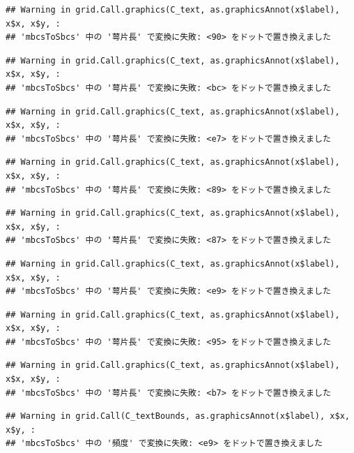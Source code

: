 \documentclass[
]{book}
\begin{document}
\begin{verbatim}
## Warning in grid.Call.graphics(C_text, as.graphicsAnnot(x$label), x$x, x$y, :
## 'mbcsToSbcs' 中の '萼片長' で変換に失敗: <90> をドットで置き換えました
\end{verbatim}

\begin{verbatim}
## Warning in grid.Call.graphics(C_text, as.graphicsAnnot(x$label), x$x, x$y, :
## 'mbcsToSbcs' 中の '萼片長' で変換に失敗: <bc> をドットで置き換えました
\end{verbatim}

\begin{verbatim}
## Warning in grid.Call.graphics(C_text, as.graphicsAnnot(x$label), x$x, x$y, :
## 'mbcsToSbcs' 中の '萼片長' で変換に失敗: <e7> をドットで置き換えました
\end{verbatim}

\begin{verbatim}
## Warning in grid.Call.graphics(C_text, as.graphicsAnnot(x$label), x$x, x$y, :
## 'mbcsToSbcs' 中の '萼片長' で変換に失敗: <89> をドットで置き換えました
\end{verbatim}

\begin{verbatim}
## Warning in grid.Call.graphics(C_text, as.graphicsAnnot(x$label), x$x, x$y, :
## 'mbcsToSbcs' 中の '萼片長' で変換に失敗: <87> をドットで置き換えました
\end{verbatim}

\begin{verbatim}
## Warning in grid.Call.graphics(C_text, as.graphicsAnnot(x$label), x$x, x$y, :
## 'mbcsToSbcs' 中の '萼片長' で変換に失敗: <e9> をドットで置き換えました
\end{verbatim}

\begin{verbatim}
## Warning in grid.Call.graphics(C_text, as.graphicsAnnot(x$label), x$x, x$y, :
## 'mbcsToSbcs' 中の '萼片長' で変換に失敗: <95> をドットで置き換えました
\end{verbatim}

\begin{verbatim}
## Warning in grid.Call.graphics(C_text, as.graphicsAnnot(x$label), x$x, x$y, :
## 'mbcsToSbcs' 中の '萼片長' で変換に失敗: <b7> をドットで置き換えました
\end{verbatim}

\begin{verbatim}
## Warning in grid.Call(C_textBounds, as.graphicsAnnot(x$label), x$x, x$y, :
## 'mbcsToSbcs' 中の '頻度' で変換に失敗: <e9> をドットで置き換えました
\end{verbatim}
\end{document}
